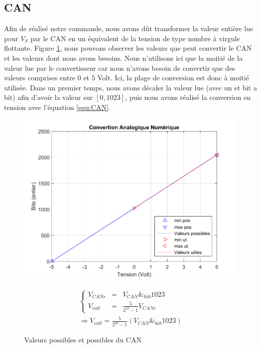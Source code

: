 \subsection{CAN}
Afin de réalisé notre commande, nous avons dût transformer la valeur entière lue pour $V_S$ par le CAN en un équivalent de la tension de type nombre à virgule flottante.  Figure \ref{fig:CAN_p}, nous pouvons observer les valeurs que peut convertir le CAN et les valeurs dont nous avons besoins. Nous n'utilisons ici que la moitié de la valeur lue par le convertisseur car nous n'avons besoin de convertir que des valeurs comprises entre $0$ et $5$ Volt. Ici, la plage de conversion est donc à moitié utilisée. 
Dans un premier temps, nous avons décaler la valeur lue (avec un et bit a bit) afin d'avoir la valeur sur $\left[ 0 , 1023\right]$,  puis  nous avons réalisé la conversion en tension avec l'équation \ref{equ:CAN}.
\begin{figure}[!ht]%
\begin{minipage}{.5\textwidth}%
\centering
\includegraphics[width=\textwidth]{./VI/images/CAN_plage.pdf}
\caption{\label{fig:CAN_p}Valeurs possibles et possibles du CAN}
\end{minipage}%
\hfill%
\begin{minipage}{.5\textwidth}%
\begin{equation}
\begin{array}{l}
\left\lbrace
\begin{array}{lcl}
\label{equ:CAN1}V_{CANr} &=& V_{CAN} \&_{bàb} 1023\\
V_{volt} &=& \frac{5}{2^{10}-1}V_{CANr}
\end{array}
\right.\\
\Rightarrow V_{volt} = \frac{5}{2^{10}-1}( V_{CAN} \&_{bàb} 1023)
\end{array}
\end{equation}
\end{minipage}%
\end{figure}




